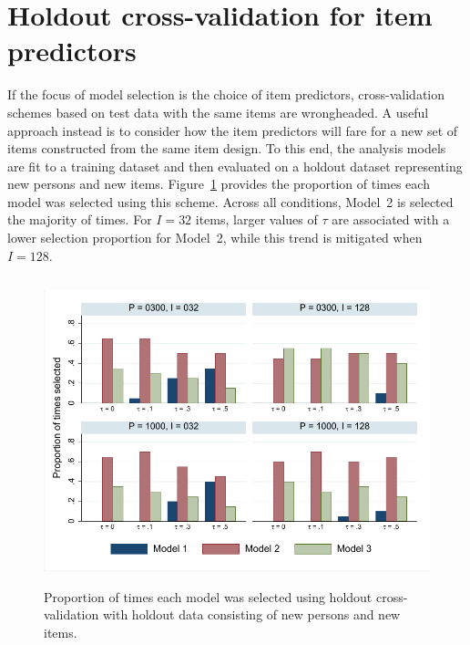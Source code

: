 \documentclass[12pt, letterpaper]{article}
\begin{document}
%
%


\section{Holdout cross-validation for item predictors}

If the focus of model selection is the choice of item predictors, cross-validation schemes based on test data with the same items are wrongheaded. A useful approach instead is to consider how the item predictors will fare for a new set of items constructed from the same item design. To this end, the analysis models are fit to a training dataset and then evaluated on a holdout dataset representing new persons and new items. Figure~\ref{fig:both-bar} provides the proportion of times each model was selected using this scheme. Across all conditions, Model~2 is selected the majority of times. For $I=32$ items, larger values of $\tau$ are associated with a lower selection proportion for Model~2, while this trend is mitigated when $I=128$.

\begin{figure}[htbp]
	\centering
	\includegraphics[height=3.5in, trim = 1mm 1mm 1mm 1mm, clip=true]
		{chapter_2/figs/p_new_person_new_item.pdf}
	\caption{Proportion of times each model was selected using holdout cross-validation with holdout data consisting of new persons and new items.}
	\label{fig:both-bar}
\end{figure}
\end{document}
